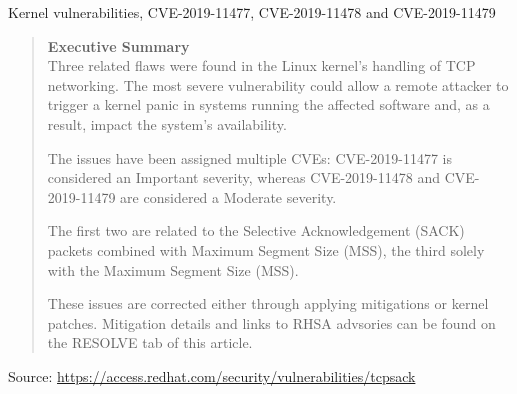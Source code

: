 \documentclass[Screen16to9,17pt]{foils}
\begin{document}

Kernel vulnerabilities, CVE-2019-11477, CVE-2019-11478 and CVE-2019-11479

\begin{quote}\footnotesize{\bf
Executive Summary}\\
Three related flaws were found in the Linux kernel’s handling of TCP networking.  The most severe vulnerability could allow a remote attacker to trigger a kernel panic in systems running the affected software and, as a result, impact the system’s availability.

The issues have been assigned multiple CVEs: CVE-2019-11477 is considered an Important severity, whereas CVE-2019-11478 and CVE-2019-11479 are considered a Moderate severity.

The first two are related to the Selective Acknowledgement (SACK) packets combined with Maximum Segment Size (MSS), the third solely with the Maximum Segment Size (MSS).

These issues are corrected either through applying mitigations or kernel patches.  Mitigation details and links to RHSA advsories can be found on the RESOLVE tab of this article.
\end{quote}

Source: {\footnotesize\url{https://access.redhat.com/security/vulnerabilities/tcpsack}}




\slidenext
\end{document}
